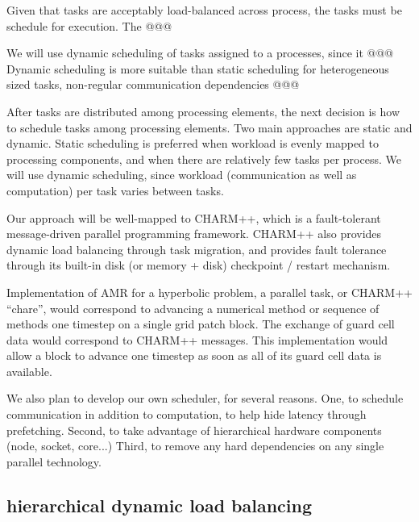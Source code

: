 \documentclass[14pt,letter]{article}
\begin{document}
Given that tasks are acceptably load-balanced across process, the
tasks must be schedule for execution.  The @@@


We will use dynamic scheduling of tasks assigned to a processes, since
it @@@  Dynamic scheduling is more suitable than static scheduling for
heterogeneous sized tasks, non-regular communication dependencies @@@


After tasks are distributed among processing elements, the next
decision is how to schedule tasks among processing elements.  Two main
approaches are static and dynamic.  Static scheduling is preferred
when workload is evenly mapped to processing components, and when
there are relatively few tasks per process.  We will use dynamic
scheduling, since workload (communication as well as computation) per
task varies between tasks.

Our approach will be well-mapped to CHARM++,
which is a fault-tolerant message-driven parallel programming
framework.  CHARM++ also provides dynamic load balancing through task
migration, and provides fault tolerance through its built-in disk (or
memory + disk) checkpoint / restart mechanism.

Implementation of AMR for a hyperbolic problem, a parallel task, or
CHARM++ ``chare'', would correspond to advancing a numerical method or
sequence of methods one timestep on a single grid patch block.  The
exchange of guard cell data would correspond to CHARM++ messages.
This implementation would allow a block to advance one timestep as
soon as all of its guard cell data is available.


We also plan to develop our own scheduler, for several reasons.  One,
to schedule communication in addition to computation, to help hide
latency through prefetching.  Second, to take advantage of
hierarchical hardware components (node, socket, core...)  Third, to
remove any hard dependencies on any single parallel technology.

\subsection{hierarchical dynamic load balancing}
\end{document}
